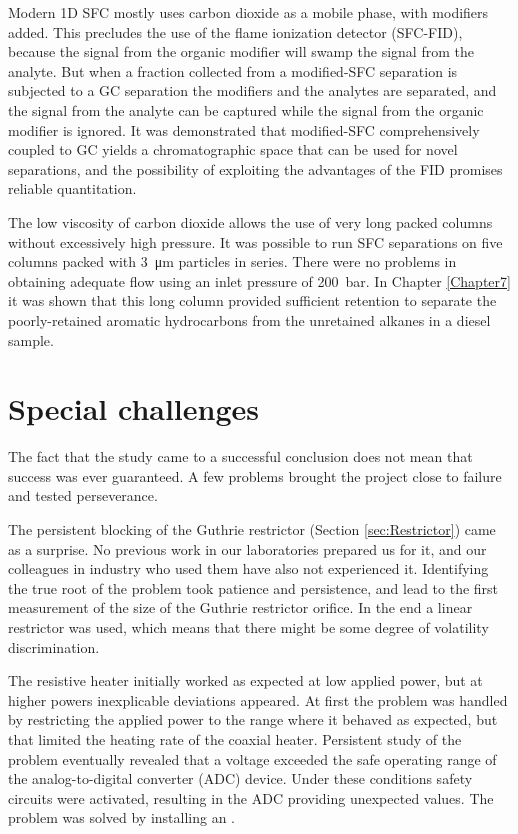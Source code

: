 Modern 1D SFC mostly uses carbon dioxide as a mobile phase, with modifiers
added. This precludes the use of the flame ionization detector (SFC-FID),
because the signal from the organic modifier will swamp the signal from the
analyte. But when a fraction collected from a modified-SFC separation is
subjected to a GC separation the modifiers and the analytes are separated, and
the signal from the analyte can be captured while the signal from the organic
modifier is ignored. It was demonstrated that modified-SFC comprehensively
coupled to GC yields a chromatographic space that can be used for novel
separations, and the possibility of exploiting the advantages of the FID
promises reliable quantitation.

The low viscosity of carbon dioxide allows the use of very long packed columns
without excessively high pressure. It was possible to run SFC separations on
five columns packed with \SI{3}{\micro\metre} particles in series. There were no
problems in obtaining adequate flow using an inlet pressure of \SI{200}{\bar}.
In Chapter \ref{Chapter7} it was shown that this long column provided sufficient
retention to separate the poorly-retained aromatic hydrocarbons from the
unretained alkanes in a diesel sample.

\section{Special challenges}

The fact that the study came to a successful conclusion does not mean that
success was ever guaranteed. A few problems brought the project close to
failure and tested perseverance.

The persistent blocking of the Guthrie restrictor (Section \ref{sec:Restrictor})
came as a surprise. No previous work in our laboratories prepared us for it, and
our colleagues in industry who used them have also not experienced it.
Identifying the true root of the problem took patience and persistence, and lead
to the first measurement of the size of the Guthrie restrictor orifice. In the
end a linear restrictor was used, which means that there might be some degree of
volatility discrimination.

The resistive heater initially worked as expected at low applied power, but at
higher powers inexplicable deviations appeared. At first the problem was handled
by restricting the applied power to the range where it behaved as expected, but
that limited the heating rate of the coaxial heater. Persistent study of the
problem eventually revealed that a voltage exceeded the safe operating range of
the analog-to-digital converter (ADC) device. Under these conditions safety
circuits were activated, resulting in the ADC providing unexpected values. The
problem was solved by installing an .


